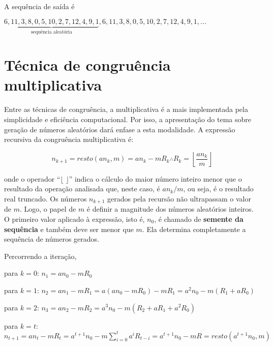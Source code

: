 \documentclass[a4paper,12pt,oneside,onecolumn]{uerj/uerj}
\begin{document}
\noindent A sequência de saída é

\begin{center}
$\underbrace{6, 11,  3,  8,  0,  5, 10,  2,  7, 12,  4,  9,  1}_{\text{sequência aleatória}},  6, 11,  3,  8,  0,  5, 10,  2,  7, 12,  4,  9,  1, ...$
\end{center}

\section{Técnica de congruência multiplicativa}

Entre as técnicas de congruência, a multiplicativa é a mais implementada pela simplicidade e eficiência computacional. Por isso, a apresentação do tema sobre geração de números aleatórios dará enfase a esta modalidade. A expressão recursiva da congruência multiplicativa é:

\begin{equation}
n_{k+1} = resto(an_{k},m) = an_{k} - mR_k \therefore R_k = \left\lfloor \frac{an_{k}}{m}\right\rfloor
\end{equation}

\noindent onde o operador ``$\lfloor$ $\rfloor$'' indica o cálculo do maior número inteiro menor que o resultado da operação analisada que, neste caso, é $an_{k}/m$, ou seja, é o resultado real truncado. Os números $n_{k+1}$ gerados pela recursão não ultrapassam o valor de $m$. Logo, o papel de $m$ é definir a magnitude dos números aleatórios inteiros. O primeiro valor aplicado à expressão, isto é, $n_0$, é chamado de \textbf{semente da sequência} e também deve ser menor que $m$. Ela determina completamente a sequência de números gerados.

Percorrendo a iteração, 

\begin{lcircp}
    \item para $k=0$: $n_1 = an_0 - mR_0$
    \item para $k=1$: $n_2 = an_1 - mR_1 = a(an_0 - mR_0) - mR_1 = a^2n_0 - m(R_1 + aR_0)$
    \item para $k=2$: $n_3 = an_2 - mR_2 = a^3n_0 - m(R_2 + aR_1 + a^2R_0)$
    \item para $k=t$: $n_{t+1} = an_t - mR_t = a^{t+1}n_0 - m\sum_{i=0}^{t} a^iR_{t-i} = a^{t+1}n_0 - mR = resto(a^{t+1}n_0,m)$\\
\end{lcircp}
\end{document}
